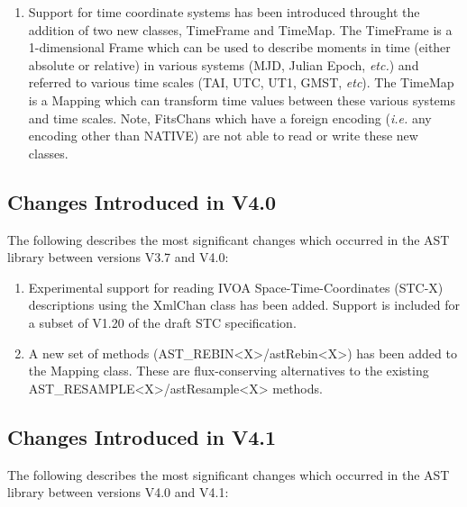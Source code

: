 \documentclass[twoside,11pt]{article}
\begin{document}
\begin{enumerate}

\item Support for time coordinate systems has been introduced
throught the addition of two new classes, TimeFrame and TimeMap.
The TimeFrame is a 1-dimensional Frame which can be used to describe
moments in time (either absolute or relative) in various systems (MJD,
Julian Epoch, \emph{etc.}) and referred to various time scales (TAI, UTC,
UT1, GMST, \emph{etc}). The TimeMap is a Mapping which can transform time
values between these various systems and time scales. Note,
FitsChans which have a foreign encoding (\emph{i.e.} any encoding other
than NATIVE) are not able to read or write these new classes.

\end{enumerate}


\subsection{Changes Introduced in V4.0}

The following describes the most significant changes which
occurred in the AST library between versions V3.7 and V4.0:

\begin{enumerate}

\item Experimental support for reading IVOA Space-Time-Coordinates (STC-X)
descriptions using the XmlChan class has been added. Support is included
for a subset of V1.20 of the draft STC specification.

\item A new set of methods (AST\_REBIN<X>/astRebin<X>) has been added to
the Mapping class. These are flux-conserving alternatives to the existing
AST\_RESAMPLE<X>/astResample<X> methods.

\end{enumerate}


\subsection{Changes Introduced in V4.1}

The following describes the most significant changes which
occurred in the AST library between versions V4.0 and V4.1:
\end{document}
